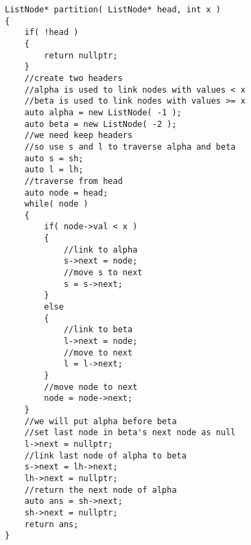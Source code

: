 \setcounter{lstlisting}{0}
\begin{lstlisting}[style=customc, caption={Two Dummy Nodes}]
ListNode* partition( ListNode* head, int x )
{
    if( !head )
    {
        return nullptr;
    }
    //create two headers
    //alpha is used to link nodes with values < x
    //beta is used to link nodes with values >= x
    auto alpha = new ListNode( -1 );
    auto beta = new ListNode( -2 );
    //we need keep headers
    //so use s and l to traverse alpha and beta
    auto s = sh;
    auto l = lh;
    //traverse from head
    auto node = head;
    while( node )
    {
        if( node->val < x )
        {
            //link to alpha
            s->next = node;
            //move s to next
            s = s->next;
        }
        else
        {
            //link to beta
            l->next = node;
            //move to next
            l = l->next;
        }
        //move node to next
        node = node->next;
    }
    //we will put alpha before beta
    //set last node in beta's next node as null
    l->next = nullptr;
    //link last node of alpha to beta
    s->next = lh->next;
    lh->next = nullptr;
    //return the next node of alpha
    auto ans = sh->next;
    sh->next = nullptr;
    return ans;
}
\end{lstlisting}
